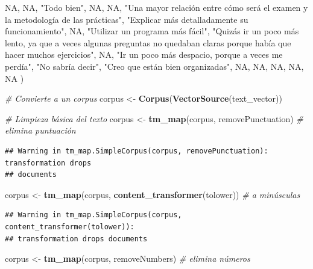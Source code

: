 \documentclass[
]{article}
\newenvironment{Shaded}{\begin{snugshade}}{\end{snugshade}}
\newcommand{\CommentTok}[1]{\textcolor[rgb]{0.56,0.35,0.01}{\textit{#1}}}
\newcommand{\ConstantTok}[1]{\textcolor[rgb]{0.56,0.35,0.01}{#1}}
\newcommand{\FunctionTok}[1]{\textcolor[rgb]{0.13,0.29,0.53}{\textbf{#1}}}
\newcommand{\NormalTok}[1]{#1}
\newcommand{\OtherTok}[1]{\textcolor[rgb]{0.56,0.35,0.01}{#1}}
\newcommand{\StringTok}[1]{\textcolor[rgb]{0.31,0.60,0.02}{#1}}
\begin{document}
\begin{Shaded}
\begin{Highlighting}[]
  \ConstantTok{NA}\NormalTok{,}
  \ConstantTok{NA}\NormalTok{,}
  \StringTok{"Todo bien"}\NormalTok{,}
  \ConstantTok{NA}\NormalTok{,}
  \ConstantTok{NA}\NormalTok{,}
  \StringTok{"Una mayor relación entre cómo será el examen y la metodología de las prácticas"}\NormalTok{,}
  \StringTok{"Explicar más detalladamente su funcionamiento"}\NormalTok{,}
  \ConstantTok{NA}\NormalTok{,}
  \StringTok{"Utilizar un programa más fácil"}\NormalTok{,}
  \StringTok{"Quizás ir un poco más lento, ya que a veces algunas preguntas no quedaban claras porque había que hacer muchos ejercicios"}\NormalTok{,}
  \ConstantTok{NA}\NormalTok{,}
  \StringTok{"Ir un poco más despacio, porque a veces me perdía"}\NormalTok{,}
  \StringTok{"No sabría decir"}\NormalTok{,}
  \StringTok{"Creo que están bien organizadas"}\NormalTok{,}
  \ConstantTok{NA}\NormalTok{,}
  \ConstantTok{NA}\NormalTok{,}
  \ConstantTok{NA}\NormalTok{,}
  \ConstantTok{NA}\NormalTok{,}
  \ConstantTok{NA}
\NormalTok{)}

\CommentTok{\# Convierte a un corpus}
\NormalTok{corpus }\OtherTok{\textless{}{-}} \FunctionTok{Corpus}\NormalTok{(}\FunctionTok{VectorSource}\NormalTok{(text\_vector))}

\CommentTok{\# Limpieza básica del texto}
\NormalTok{corpus }\OtherTok{\textless{}{-}} \FunctionTok{tm\_map}\NormalTok{(corpus, removePunctuation)                    }\CommentTok{\# elimina puntuación}
\end{Highlighting}
\end{Shaded}

\begin{verbatim}
## Warning in tm_map.SimpleCorpus(corpus, removePunctuation): transformation drops
## documents
\end{verbatim}

\begin{Shaded}
\begin{Highlighting}[]
\NormalTok{corpus }\OtherTok{\textless{}{-}} \FunctionTok{tm\_map}\NormalTok{(corpus, }\FunctionTok{content\_transformer}\NormalTok{(tolower))         }\CommentTok{\# a minúsculas}
\end{Highlighting}
\end{Shaded}

\begin{verbatim}
## Warning in tm_map.SimpleCorpus(corpus, content_transformer(tolower)):
## transformation drops documents
\end{verbatim}

\begin{Shaded}
\begin{Highlighting}[]
\NormalTok{corpus }\OtherTok{\textless{}{-}} \FunctionTok{tm\_map}\NormalTok{(corpus, removeNumbers)                        }\CommentTok{\# elimina números}
\end{Highlighting}
\end{Shaded}
\end{document}
